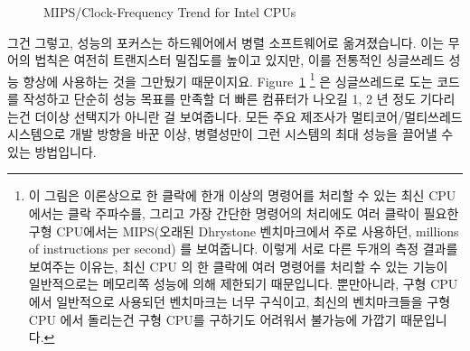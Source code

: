\begin{figure}[tb]
\begin{center}
\end{center}
\caption{MIPS/Clock-Frequency Trend for Intel CPUs}
\label{fig:intro:Clock-Frequency Trend for Intel CPUs}
\end{figure}

그건 그렇고, 성능의 포커스는 하드웨어에서 병렬 소프트웨어로 옮겨졌습니다.
이는 무어의 법칙은 여전히 트랜지스터 밀집도를 높이고 있지만, 이를 전통적인
싱글쓰레드 성능 향상에 사용하는 것을 그만뒀기 때문이지요.
Figure~\ref{fig:intro:Clock-Frequency Trend for Intel CPUs} \footnote{
	이 그림은 이론상으로 한 클락에 한개 이상의 명령어를 처리할 수 있는 최신
	CPU 에서는 클락 주파수를, 그리고 가장 간단한 명령어의 처리에도 여러
	클락이 필요한 구형 CPU에서는 MIPS(오래된 Dhrystone 벤치마크에서 주로
	사용하던, millions of instructions per second) 를 보여줍니다.
	이렇게 서로 다른 두개의 측정 결과를 보여주는 이유는, 최신 CPU 의 한
	클락에 여러 명령어를 처리할 수 있는 기능이 일반적으로는 메모리쪽 성능에
	의해 제한되기 때문입니다.
	뿐만아니라, 구형 CPU 에서 일반적으로 사용되던 벤치마크는 너무 구식이고,
	최신의 벤치마크들을 구형 CPU 에서 돌리는건 구형 CPU를 구하기도 어려워서
	불가능에 가깝기 때문입니다.}
은 싱글쓰레드로 도는 코드를 작성하고 단순히 성능 목표를 만족할 더 빠른 컴퓨터가
나오길 1, 2 년 정도 기다리는건 더이상 선택지가 아니란 걸 보여줍니다.
모든 주요 제조사가 멀티코어/멀티쓰레드 시스템으로 개발 방향을 바꾼 이상,
병렬성만이 그런 시스템의 최대 성능을 끌어낼 수 있는 방법입니다.

